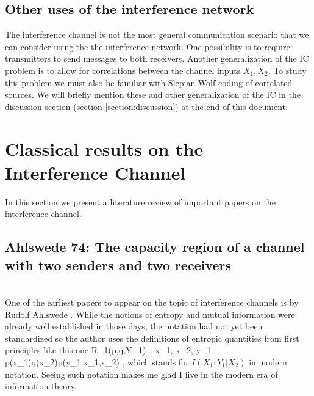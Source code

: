 \documentclass[aps,11pt,twoside,letterpaper]{article}
\begin{document}
    \subsection{Other uses of the interference network}

        The interference channel is not the most general communication scenario
        that we can consider using the the interference network.
        One possibility is to require transmitters to send messages to both
        receivers.
        Another generalization %
        of the IC problem is to allow for correlations between the channel inputs $X_1,X_2$.
        To study this problem we must also be familiar with Slepian-Wolf
        coding of correlated sources. 
        We will briefly mention these and other generalization of the IC in the discussion
        section (section  \ref{section:discussion}) at the end of this document.

        




\section{Classical results on the Interference Channel}   \label{section:lit-review}

    
    In this section we present a literature review of important papers 
    on the interference channel.
    



        \subsection{Ahlswede 74: The capacity region of a channel with two senders and two receivers} \ \\
        
            One of the earliest papers to appear on the topic of interference channels is by Rudolf Ahlswede \cite{Ahlswede1974}.
            While the notions of entropy and mutual information were already well established in those days, 
            the notation had not yet been standardized so the author uses the definitions of entropic 
            quantities from first principles like this one
            \be
                R_1(p,q,Y_1) \triangleq
                    \sum_{x_1, x_2, y_1} 
                        p(x_1)q(x_2)p(y_1|x_1,x_2) 
                        \log {},
            \ee
            which stands for $I(X_1;Y_1|X_2)$ in modern notation. Seeing such notation makes
            me glad I live in the modern era of information theory. 
\end{document}
